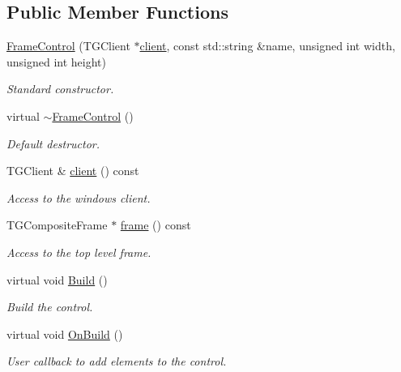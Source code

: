 \subsection*{Public Member Functions}
\begin{DoxyCompactItemize}
\item 
\hyperlink{class_d_d4hep_1_1_frame_control_aaecdd9166d4089a7e7892b88f4359126}{Frame\+Control} (T\+G\+Client $\ast$\hyperlink{class_d_d4hep_1_1_frame_control_a875fe567aff91495ac78358850acf062}{client}, const std\+::string \&name, unsigned int width, unsigned int height)
\begin{DoxyCompactList}\small\item\em Standard constructor. \end{DoxyCompactList}\item 
virtual \hyperlink{class_d_d4hep_1_1_frame_control_a84ff9b8462de97610195757d2cce4dd8}{$\sim$\+Frame\+Control} ()
\begin{DoxyCompactList}\small\item\em Default destructor. \end{DoxyCompactList}\item 
T\+G\+Client \& \hyperlink{class_d_d4hep_1_1_frame_control_a875fe567aff91495ac78358850acf062}{client} () const
\begin{DoxyCompactList}\small\item\em Access to the windows client. \end{DoxyCompactList}\item 
T\+G\+Composite\+Frame $\ast$ \hyperlink{class_d_d4hep_1_1_frame_control_a0c4c3be45b2555db5aa71f8eee7b908b}{frame} () const
\begin{DoxyCompactList}\small\item\em Access to the top level frame. \end{DoxyCompactList}\item 
virtual void \hyperlink{class_d_d4hep_1_1_frame_control_a4ef181d24de565d17511bb9f5098184c}{Build} ()
\begin{DoxyCompactList}\small\item\em Build the control. \end{DoxyCompactList}\item 
virtual void \hyperlink{class_d_d4hep_1_1_frame_control_a934ef76420162167364133e43c7be8b5}{On\+Build} ()
\begin{DoxyCompactList}\small\item\em User callback to add elements to the control. \end{DoxyCompactList}\item 

\end{DoxyCompactItemize}
